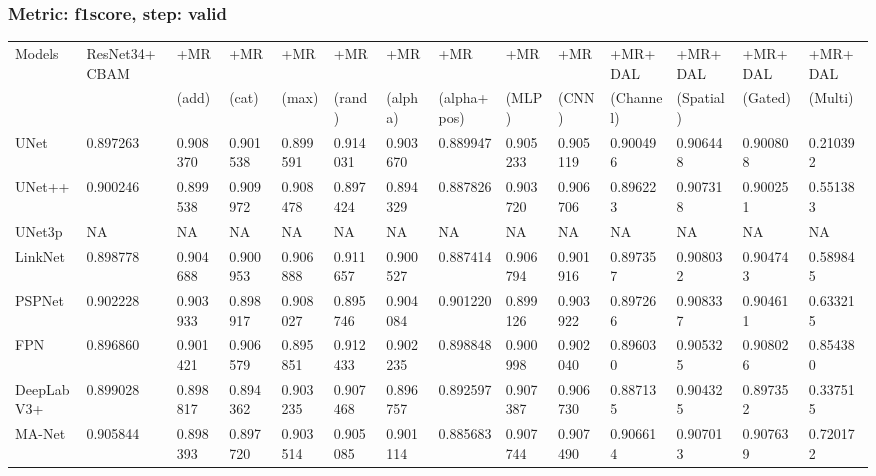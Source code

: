 \documentclass{article}
\begin{document}
\subsubsection{Metric: f1score, step: valid}
\begin{tabular}{llllllllllllll}
\toprule
Models & ResNet34+CBAM & +MR  & +MR  & +MR  & +MR  & +MR  & +MR  & +MR  & +MR  & +MR+DAL & +MR+DAL & +MR+DAL & +MR+DAL \\
       &             &  (add) &  (cat) &  (max) &  (rand) &  (alpha) &  (alpha+pos) &  (MLP) &  (CNN) & (Channel) & (Spatial) & (Gated) & (Multi) \\
\midrule
UNet & 0.897263 & 0.908370 & 0.901538 & 0.899591 & 0.914031 & 0.903670 & 0.889947 & 0.905233 & 0.905119 & 0.900496 & 0.906448 & 0.900808 & 0.210392 \\
UNet++ & 0.900246 & 0.899538 & 0.909972 & 0.908478 & 0.897424 & 0.894329 & 0.887826 & 0.903720 & 0.906706 & 0.896223 & 0.907318 & 0.900251 & 0.551383 \\
UNet3p & NA & NA & NA & NA & NA & NA & NA & NA & NA & NA & NA & NA & NA \\
LinkNet & 0.898778 & 0.904688 & 0.900953 & 0.906888 & 0.911657 & 0.900527 & 0.887414 & 0.906794 & 0.901916 & 0.897357 & 0.908032 & 0.904743 & 0.589845 \\
PSPNet & 0.902228 & 0.903933 & 0.898917 & 0.908027 & 0.895746 & 0.904084 & 0.901220 & 0.899126 & 0.903922 & 0.897266 & 0.908337 & 0.904611 & 0.633215 \\
FPN & 0.896860 & 0.901421 & 0.906579 & 0.895851 & 0.912433 & 0.902235 & 0.898848 & 0.900998 & 0.902040 & 0.896030 & 0.905325 & 0.908026 & 0.854380 \\
DeepLabV3+ & 0.899028 & 0.898817 & 0.894362 & 0.903235 & 0.907468 & 0.896757 & 0.892597 & 0.907387 & 0.906730 & 0.887135 & 0.904325 & 0.897352 & 0.337515 \\
MA-Net & 0.905844 & 0.898393 & 0.897720 & 0.903514 & 0.905085 & 0.901114 & 0.885683 & 0.907744 & 0.907490 & 0.906614 & 0.907013 & 0.907639 & 0.720172 \\
\bottomrule
\end{tabular}
\end{document}
